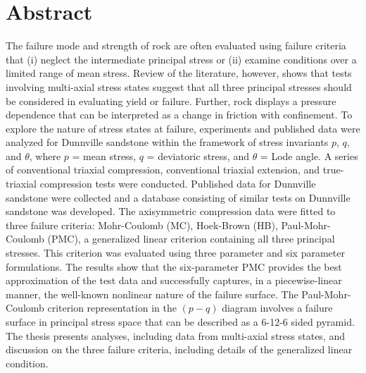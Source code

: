 

\cleardoublepage
\chapter*{Abstract}
The failure mode and strength of rock are often evaluated using failure criteria that (i) neglect the intermediate principal stress or (ii) examine conditions over a limited range of mean stress. Review of the literature, however, shows that tests involving multi-axial stress states suggest that all three principal stresses should be considered in evaluating yield or failure. Further, rock displays a pressure dependence that can be interpreted as a change in friction with confinement. To explore the nature of stress states at failure, experiments and published data were analyzed for Dunnville sandstone within the framework of stress invariants $p$, $q$, and $\theta$, where $p$ = mean stress, $q$ = deviatoric stress, and $\theta$ = Lode angle. A series of conventional triaxial compression, conventional triaxial extension, and true-triaxial compression tests were conducted. Published data for Dunnville sandstone were collected and a database consisting of similar tests on Dunnville sandstone was developed. The axisymmetric compression data were fitted to three failure criteria: Mohr-Coulomb (MC), Hoek-Brown (HB), Paul-Mohr-Coulomb (PMC), a generalized linear criterion containing all three principal stresses. This criterion was evaluated using three parameter and six parameter formulations. The results show that the six-parameter PMC provides the best approximation of the test data and successfully captures, in a piecewise-linear manner, the well-known nonlinear nature of the failure surface. The Paul-Mohr-Coulomb criterion representation in the $(p-q)$ diagram involves a failure surface in principal stress space that can be described as a 6-12-6 sided pyramid. The thesis presents analyses, including data from multi-axial stress states, and discussion on the three failure criteria, including details of the generalized linear condition. 









